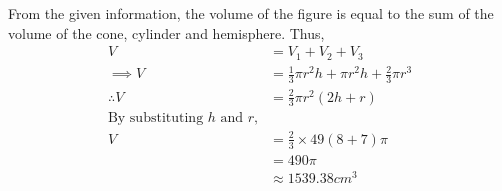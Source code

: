 \documentclass[journal,12pt,twocolumn]{IEEEtran}
\begin{document}
From the given information, the volume of the figure is equal to the sum of the volume of the cone, cylinder and hemisphere. Thus,
\begin{align*}
    V &= V_1 + V_2 + V_3\\
    \implies V &= \frac{1}{3} \pi r^2 h + \pi r^2 h + \frac{2}{3} \pi r^3
    \\
    \therefore V&= \frac{2}{3} \pi r^2 (2h+r)
    \\
    \text{By substituting $h$ and $r$,}
    \\
    V &= \frac{2}{3} \times 49 (8+7) \pi
    \\
    &= 490 \pi
    \\ 
    &\approx 1539.38cm^3
\end{align*}
\end{document}
